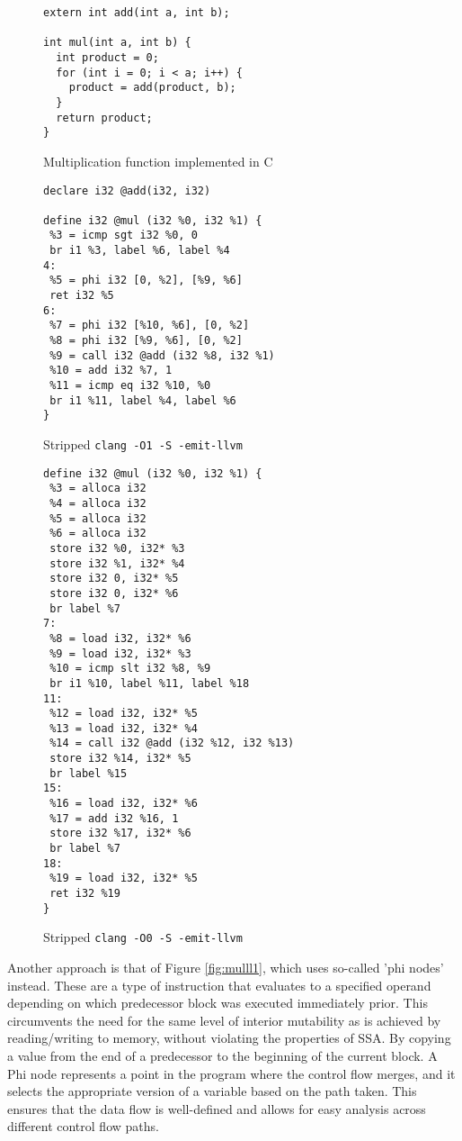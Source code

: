 \documentclass{article}
\begin{document}
\begin{figure}[!ht]
   \begin{minipage}{0.48\textwidth}
     \centering
     \begin{verbatim}
extern int add(int a, int b);

int mul(int a, int b) {
  int product = 0;
  for (int i = 0; i < a; i++) {
    product = add(product, b);
  }
  return product;
}
     \end{verbatim}
     \caption{Multiplication function implemented in C}\label{fig:mulc}
     \vspace{2.1em}
     \begin{verbatim}
declare i32 @add(i32, i32)

define i32 @mul (i32 %0, i32 %1) {
 %3 = icmp sgt i32 %0, 0
 br i1 %3, label %6, label %4
4:
 %5 = phi i32 [0, %2], [%9, %6]
 ret i32 %5
6:
 %7 = phi i32 [%10, %6], [0, %2]
 %8 = phi i32 [%9, %6], [0, %2]
 %9 = call i32 @add (i32 %8, i32 %1)
 %10 = add i32 %7, 1
 %11 = icmp eq i32 %10, %0
 br i1 %11, label %4, label %6
}
     \end{verbatim}
     \caption{Stripped \texttt{clang -O1 -S -emit-llvm}}\label{fig:mulll1}
   \end{minipage}\hfill
   \begin{minipage}{0.48\textwidth}
     \centering
     \begin{verbatim}
define i32 @mul (i32 %0, i32 %1) {
 %3 = alloca i32
 %4 = alloca i32
 %5 = alloca i32
 %6 = alloca i32
 store i32 %0, i32* %3
 store i32 %1, i32* %4
 store i32 0, i32* %5
 store i32 0, i32* %6
 br label %7
7:
 %8 = load i32, i32* %6
 %9 = load i32, i32* %3
 %10 = icmp slt i32 %8, %9
 br i1 %10, label %11, label %18
11:
 %12 = load i32, i32* %5
 %13 = load i32, i32* %4
 %14 = call i32 @add (i32 %12, i32 %13)
 store i32 %14, i32* %5
 br label %15
15:
 %16 = load i32, i32* %6
 %17 = add i32 %16, 1
 store i32 %17, i32* %6
 br label %7
18:
 %19 = load i32, i32* %5
 ret i32 %19
}
     \end{verbatim}
     \caption{Stripped \texttt{clang -O0 -S -emit-llvm}}\label{fig:mulll0}
   \end{minipage}
\end{figure}
\noindent Another approach is that of Figure \ref{fig:mulll1}, which uses so-called 'phi nodes' instead.  These are a type of instruction that evaluates to a specified operand depending on which predecessor block was executed immediately prior. This circumvents the need for the same level of interior mutability as is achieved by reading/writing to memory, without violating the properties of SSA. By copying a value from the end of a predecessor to the beginning of the current block.
A Phi node represents a point in the program where the control flow merges, and it selects the appropriate version of a variable based on the path taken. This ensures that the data flow is well-defined and allows for easy analysis across different control flow paths.
\end{document}
